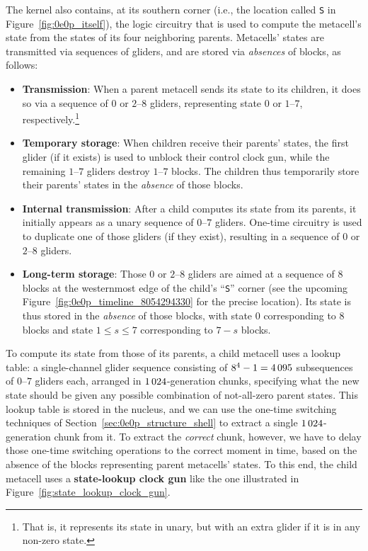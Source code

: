 The kernel also contains, at its southern corner (i.e., the location called \texttt{S} in Figure~\ref{fig:0e0p_itself}), the logic circuitry that is used to compute the metacell's state from the states of its four neighboring parents. Metacells' states are transmitted via sequences of gliders, and are stored via \emph{absences} of blocks, as follows:\smallskip

\begin{itemize}
	\item \textbf{Transmission}: When a parent metacell sends its state to its children, it does so via a sequence of $0$ or $2$--$8$ gliders, representing state $0$ or $1$--$7$, respectively.\footnote{That is, it represents its state in unary, but with an extra glider if it is in any non-zero state.}\smallskip
	
	\item \textbf{Temporary storage}: When children receive their parents' states, the first glider (if it exists) is used to unblock their control clock gun, while the remaining $1$--$7$ gliders destroy $1$--$7$ blocks. The children thus temporarily store their parents' states in the \emph{absence} of those blocks.\smallskip
	
	\item \textbf{Internal transmission}: After a child computes its state from its parents, it initially appears as a unary sequence of $0$--$7$ gliders. One-time circuitry is used to duplicate one of those gliders (if they exist), resulting in a sequence of $0$ or $2$--$8$ gliders.\smallskip
	
	\item \textbf{Long-term storage}: Those $0$ or $2$--$8$ gliders are aimed at a sequence of $8$ blocks at the westernmost edge of the child's ``\texttt{S}'' corner (see the upcoming Figure~\ref{fig:0e0p_timeline_8054294330} for the precise location). Its state is thus stored in the \emph{absence} of those blocks, with state $0$ corresponding to $8$ blocks and state $1 \leq s \leq 7$ corresponding to $7 - s$ blocks.\smallskip
\end{itemize}

To compute its state from those of its parents, a child metacell uses a lookup table: a single-channel glider sequence consisting of $8^4 - 1 = 4{\,}095$ subsequences of $0$--$7$ gliders each, arranged in $1{\,}024$-generation chunks, specifying what the new state should be given any possible combination of not-all-zero parent states. This lookup table is stored in the nucleus, and we can use the one-time switching techniques of Section~\ref{sec:0e0p_structure_shell} to extract a single $1{\,}024$-generation chunk from it. To extract the \emph{correct} chunk, however, we have to delay those one-time switching operations to the correct moment in time, based on the absence of the blocks representing parent metacells' states. To this end, the child metacell uses a \textbf{state-lookup clock gun} like the one illustrated in Figure~\ref{fig:state_lookup_clock_gun}.%

